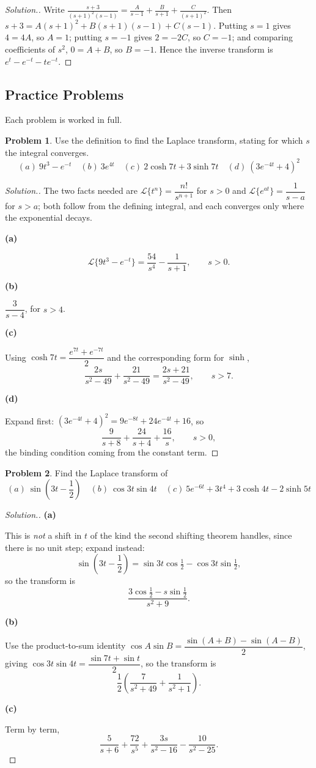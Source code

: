 \documentclass[11pt,a4paper]{article}
\theoremstyle{definition}
\newtheorem{problemx}{Problem}[subsection]
\newenvironment{problem}{\begin{problemx}}{\end{problemx}}
\newenvironment{solution}
  {\renewcommand{\qedsymbol}{}\begin{proof}[\textit{Solution}.]}
  {\end{proof}}
\newcommand{\subhead}[1]{%
  \par\medskip\noindent\textbf{#1}\par\nobreak\smallskip}
\begin{document}
\begin{solution}
Write $\frac{s + 3}{(s + 1)^2(s - 1)} = \frac{A}{s - 1} + \frac{B}{s + 1} +
\frac{C}{(s+1)^2}$. Then $s + 3 = A(s + 1)^2 + B(s + 1)(s - 1) + C(s - 1)$.
Putting $s = 1$ gives $4 = 4A$, so $A = 1$; putting $s = -1$ gives $2 = -2C$, so
$C = -1$; and comparing coefficients of $s^2$, $0 = A + B$, so $B = -1$. Hence
the inverse transform is $e^t - e^{-t} - te^{-t}$.
\end{solution}


\subsection{Practice Problems}

Each problem is worked in full.

\begin{problem}
Use the definition to find the Laplace transform, stating for which $s$ the
integral converges.
\[(a)\ 9t^3-e^{-t}\quad (b)\ 3e^{4t}\quad 
(c)\ 2\cosh 7t+3\sinh 7t\quad (d)\ (3e^{-4t}+4)^2\]
\end{problem}
\begin{solution}
The two facts needed are
$\mathcal{L}\{t^n\} = \dfrac{n!}{s^{n+1}}$ for $s>0$ and
$\mathcal{L}\{e^{at}\} = \dfrac{1}{s-a}$ for $s>a$; both follow from the
defining integral, and each converges only where the exponential decays.

\subhead{(a)}
\[\mathcal{L}\{9t^3-e^{-t}\} = \frac{54}{s^4} - \frac{1}{s+1},
\qquad s>0 .\]

\subhead{(b)}
$\dfrac{3}{s-4}$, for $s>4$.

\subhead{(c)}
Using $\cosh 7t = \dfrac{e^{7t}+e^{-7t}}{2}$ and the corresponding form for
$\sinh$,
\[\frac{2s}{s^2-49} + \frac{21}{s^2-49} = \frac{2s+21}{s^2-49},
\qquad s>7 .\]

\subhead{(d)}
Expand first:
$(3e^{-4t}+4)^2 = 9e^{-8t}+24e^{-4t}+16$, so
\[\frac{9}{s+8} + \frac{24}{s+4} + \frac{16}{s},\qquad s>0 ,\]
the binding condition coming from the constant term.
\end{solution}

\begin{problem}
Find the Laplace transform of
\[(a)\ \sin\left(3t-\frac12\right)\quad (b)\ \cos 3t\sin 4t
\quad (c)\ 5e^{-6t}+3t^4+3\cosh 4t-2\sinh 5t\]
\end{problem}
\begin{solution}
\subhead{(a)}
This is \emph{not} a shift in $t$ of the kind the second shifting theorem
handles, since there is no unit step; expand instead:
\[\sin\left(3t-\frac12\right) = \sin 3t\cos\tfrac12 - \cos 3t\sin\tfrac12 ,\]
so the transform is
\[\frac{3\cos\frac12 - s\sin\frac12}{s^2+9}.\]

\subhead{(b)}
Use the product-to-sum identity
$\cos A\sin B = \dfrac{\sin(A+B)-\sin(A-B)}{2}$, giving
$\cos 3t\sin 4t = \dfrac{\sin 7t+\sin t}{2}$, so the transform is
\[\frac12\left(\frac{7}{s^2+49} + \frac{1}{s^2+1}\right).\]

\subhead{(c)}
Term by term,
\[\frac{5}{s+6} + \frac{72}{s^5} + \frac{3s}{s^2-16} - \frac{10}{s^2-25}.\]
\end{solution}
\end{document}
